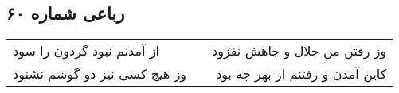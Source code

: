 \begin{center}
\section*{رباعی شماره ۶۰}
\label{sec:sh060}
\begin{longtable}{l p{0.5cm} r}
از آمدنم نبود گردون را سود
&&
وز رفتن من جلال و جاهش نفزود
\\
وز هیچ کسی نیز دو گوشم نشنود
&&
کاین آمدن و رفتنم از بهر چه بود
\\
\end{longtable}
\end{center}
